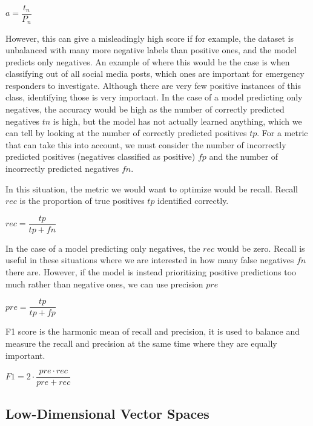 $a = \dfrac{t_n}{ P_n}  $


However, this can give a misleadingly high score if for example, the dataset is unbalanced with many more negative labels than positive ones, and the model predicts only negatives. An example of where this would be the case is when classifying out of all social media posts, which ones are important for emergency responders to investigate. Although there are very few positive instances of this class, identifying those is very important. In the case of a model predicting only negatives, the accuracy would be high as the number of correctly predicted negatives ${tn}$ is high, but the model has not actually learned anything, which we can tell by looking at the number of correctly predicted positives ${tp}$. For a metric that can take this into account, we must consider the number of incorrectly predicted positives (negatives classified as positive) ${fp}$ and the number of incorrectly predicted negatives ${fn}$.

In this situation, the metric we would want to optimize would be recall. Recall ${rec}$ is the proportion of true positives ${tp}$ identified correctly. 

${rec} = \dfrac{{tp}}{{tp} + {fn}}$

In the case of a model predicting only negatives, the ${rec}$ would be zero. Recall is useful in these situations where we are interested in how many false negatives ${fn}$ there are. However, if the model is instead prioritizing positive predictions too much rather than negative ones, we can use precision ${pre}$

${pre} = \dfrac{{tp}} {{tp} + {fp}}$


F1 score is the harmonic mean of recall and precision, it is used to balance and measure the recall and precision at the same time where they are equally important. 

${F1} = 2 \cdot \dfrac{{pre} \cdot {rec}}{{pre} + {rec}}$


\subsection{Low-Dimensional Vector Spaces}\label{ch2:vectorspaces}



